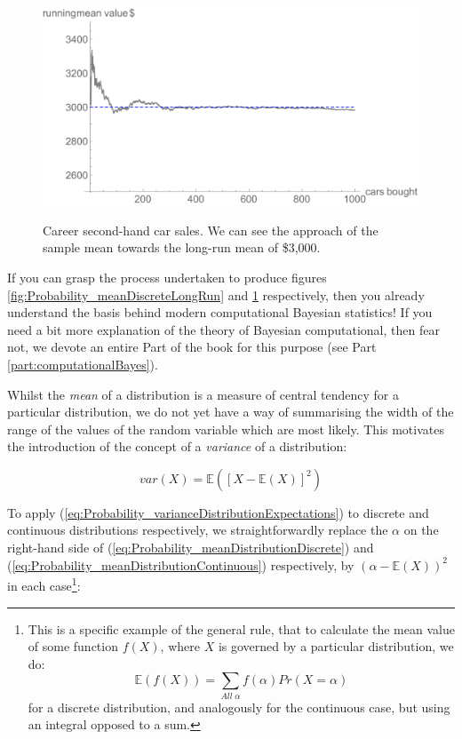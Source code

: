 \documentclass[11pt,fullpage]{book}
\begin{document}
\begin{figure}
\centering
\scalebox{0.55} 
{\includegraphics{Probability_meanContinuousLongRun.pdf}}
\caption{Career second-hand car sales. We can see the approach of the sample mean towards the long-run mean of \$3,000.}\label{fig:Probability_meanContinuousLongRun}
\end{figure}

If you can grasp the process undertaken to produce figures \ref{fig:Probability_meanDiscreteLongRun} and \ref{fig:Probability_meanContinuousLongRun} respectively, then you already understand the basis behind modern computational Bayesian statistics! If you need a bit more explanation of the theory of Bayesian computational, then fear not, we devote an entire Part of the book for this purpose (see Part \ref{part:computationalBayes}).  

Whilst the \textit{mean} of a distribution is a measure of central tendency for a particular distribution, we do not yet have a way of summarising the width of the range of the values of the random variable which are most likely. This motivates the introduction of the concept of a \textit{variance} of a distribution:

\begin{equation}\label{eq:Probability_varianceDistributionExpectations}
var(X) = \mathbb{E}\left(\left[X-\mathbb{E}(X)\right]^2\right)
\end{equation}

To apply (\ref{eq:Probability_varianceDistributionExpectations}) to discrete and continuous distributions respectively, we straightforwardly replace the $\alpha$ on the right-hand side of (\ref{eq:Probability_meanDistributionDiscrete}) and (\ref{eq:Probability_meanDistributionContinuous}) respectively, by $(\alpha-\mathbb{E}(X))^2$ in each case\footnote{This is a specific example of the general rule, that to calculate the mean value of some function $f(X)$, where $X$ is governed by a particular distribution, we do: \begin{equation}
\mathbb{E}(f(X)) = \sum\limits_{All\; \alpha} f(\alpha) Pr(X=\alpha)
\end{equation}
for a discrete distribution, and analogously for the continuous case, but using an integral opposed to a sum.}:
\end{document}
